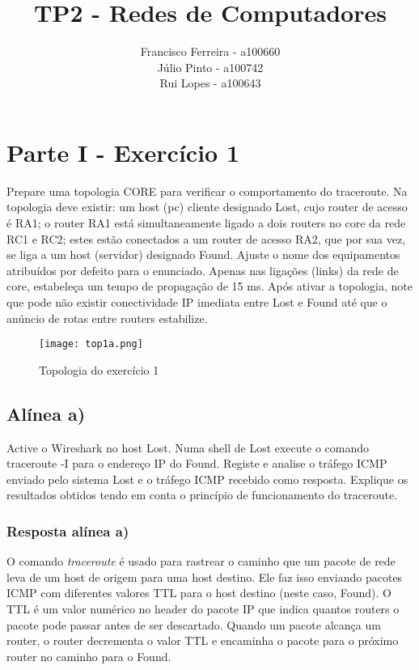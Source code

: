\documentclass{article}
\title{TP2 - Redes de Computadores}
\author{Francisco Ferreira - a100660\\Júlio Pinto - a100742\\Rui Lopes - a100643}
\begin{document}
\maketitle
\tableofcontents

\pagebreak
\bigskip

\section{Parte I - Exercício 1}

Prepare uma topologia CORE para verificar o comportamento do traceroute. Na topologia deve existir: um host (pc) cliente
designado Lost, cujo router de acesso é RA1; o router RA1 está simultaneamente ligado a dois routers no core da rede RC1 e RC2;
estes estão conectados a um router de acesso RA2, que por sua vez, se liga a um host (servidor) designado Found. Ajuste o nome
dos equipamentos atribuídos por defeito para o enunciado. Apenas nas ligações (links) da rede de core, estabeleça um tempo de
propagação de 15 ms. Após ativar a topologia, note que pode não existir conectividade IP imediata entre Lost e Found até que o
anúncio de rotas entre routers estabilize.


\begin{figure}[h]
    \centering
    \texttt{[image: top1a.png]}
    \caption{Topologia do exercício 1}
\end{figure}

\subsection{Alínea a)}

Active o Wireshark no host Lost. Numa shell de Lost execute o comando traceroute -I para o endereço IP do
Found. Registe e analise o tráfego ICMP enviado pelo sistema Lost e o tráfego ICMP recebido como resposta.
Explique os resultados obtidos tendo em conta o princípio de funcionamento do traceroute.



\subsubsection{Resposta alínea a)}

O comando \emph{traceroute} é usado para rastrear o caminho que um pacote de rede leva de um host de origem para uma host destino. Ele faz isso enviando pacotes ICMP com diferentes valores TTL para o host destino (neste caso, Found). O TTL é um valor numérico no header do pacote IP que indica quantos routers o pacote pode passar antes de ser descartado. Quando um pacote alcança um router, o router decrementa o valor TTL e encaminha o pacote para o próximo router no caminho para o Found.
\end{document}
